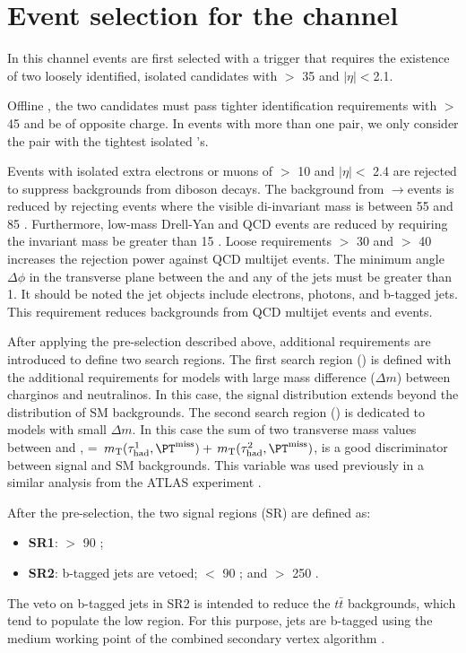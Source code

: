 \section{\texorpdfstring{Event selection for the \Tau\Tau channel}{Event selection for the tau-tau channel}}
\label{sect:tauTauCuts}
In this channel events are first selected with a trigger \cite{Khachatryan:2015hwa,Chatrchyan:2012xi,Chatrchyan:2011nv}
that requires the existence of
two loosely identified, isolated \Tau candidates with \PT $>$ 35 \GeV and $|\eta|<$2.1.   

Offline , the two \Tau candidates must pass tighter identification requirements with \PT $>$ 45 \GeV and be of opposite charge.
In events with more than one \Tau\Tau pair, we only consider the pair with the tightest isolated \Tau's. 

Events with isolated extra electrons or muons of \PT $>$ 10 \GeV and $|\eta| <$ 2.4 
are rejected to suppress %
backgrounds from diboson decays.
The background from \Z$\rightarrow$\Tau\Tau events is reduced by rejecting events where the visible
di-\Tau invariant mass is between 55 and 85 \GeV.  Furthermore, 
low-mass Drell-Yan and QCD events are reduced by requiring the invariant mass be greater than 15 \GeV.
Loose requirements \MPT $>$ 30 \GeV and \mttwo $>$ 40 \GeV increases the rejection power against QCD multijet events.
The minimum angle $\Delta\phi$ in the transverse plane between the \ptvecmiss and any of the jets must be greater than 1. 
It should be noted the jet objects include electrons, photons, \Tau and b-tagged jets.
This requirement reduces backgrounds from QCD multijet events and \wjets events.

After applying the pre-selection described above,
additional requirements are introduced to define two search regions.
The first search region (\binone) is defined with the additional requirements for models with large mass difference ($\Delta m$) 
between charginos and neutralinos.
In this case, the \mttwo signal distribution extends beyond the 
distribution of SM backgrounds.
The second search region (\bintwo) is dedicated to models with small $\Delta m$.  
In this case the sum of two transverse mass values between \Tau and \MPT , \SumMT = $\mt(\Tau^1,\MPT) + \mt(\Tau^2,\MPT)$, 
is a good discriminator between signal and SM backgrounds. 
This variable was used previously in a similar analysis from the ATLAS experiment \cite{Aad:2014yka}.

After the pre-selection, the two signal regions (SR) are defined as:
\begin{itemize}
\item {\bf SR1}: \mttwo $>$ 90 \GeV;
\item {\bf SR2}: b-tagged jets are vetoed; \mttwo $<$ 90 \GeV; and \SumMT $>$ 250 \GeV.
\end{itemize}
The veto on b-tagged jets in SR2 is intended to reduce
the $t\bar{t}$ backgrounds, which
tend to populate the low \mttwo region.  For this purpose, jets are b-tagged
using the medium working point of the combined secondary vertex algorithm \cite{Chatrchyan:2012jua}. 

